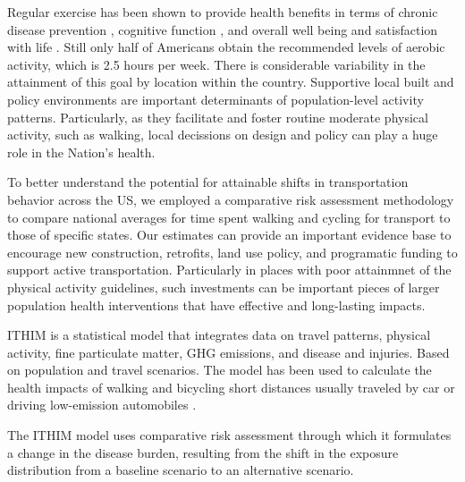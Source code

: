 Regular exercise has been shown to provide health benefits in terms of
chronic disease prevention \cite{warburton2006}, cognitive function
\cite{hillman2008}, and overall well being and satisfaction with life
\cite{maher2013}. Still only half of Americans obtain the recommended
levels of aerobic activity, which is 2.5 hours per week. There is
considerable variability in the attainment of this goal by location
within the country. Supportive local built and policy environments are
important determinants of population-level activity
patterns. Particularly, as they facilitate and foster routine moderate
physical activity, such as walking, local decissions on design and
policy can play a huge role in the Nation's health.

To better understand the potential for attainable shifts in
transportation behavior across the US, we employed a comparative risk
assessment methodology to compare national averages for time spent
walking and cycling for transport to those of specific states. Our
estimates can provide an important evidence base to encourage new
construction, retrofits, land use policy, and programatic funding to
support active transportation. Particularly in places with poor
attainmnet of the physical activity guidelines, such investments can
be important pieces of larger population health interventions that
have effective and long-lasting impacts.

ITHIM is a statistical model that integrates data on travel patterns,
physical activity, fine particulate matter, GHG emissions, and disease
and injuries. Based on population and travel scenarios. The model has
been used to calculate the health impacts of walking and bicycling
short distances usually traveled by car or driving low-emission
automobiles \cite{woodcock2013,maizlish2013}.

The ITHIM model uses comparative risk assessment through which it
formulates a change in the disease burden, resulting from the shift in
the exposure distribution from a baseline scenario to an alternative
scenario.
